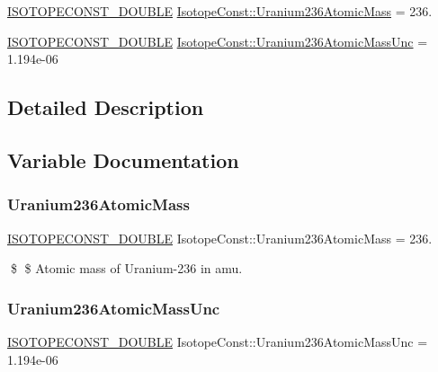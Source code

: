 \begin{DoxyCompactItemize}
\item 
\mbox{\hyperlink{group___isotope_const-_macros_ga8f45a7272ce02c0b4c65c44636ed719a}{I\+S\+O\+T\+O\+P\+E\+C\+O\+N\+S\+T\+\_\+\+D\+O\+U\+B\+LE}} \mbox{\hyperlink{group___isotope_const-_uranium-_u236_ga7f77188b8b85e605aec6bfb9cdb5fffe}{Isotope\+Const\+::\+Uranium236\+Atomic\+Mass}} = 236.
\item 
\mbox{\hyperlink{group___isotope_const-_macros_ga8f45a7272ce02c0b4c65c44636ed719a}{I\+S\+O\+T\+O\+P\+E\+C\+O\+N\+S\+T\+\_\+\+D\+O\+U\+B\+LE}} \mbox{\hyperlink{group___isotope_const-_uranium-_u236_gae130a39c824df6b756ce53dcf76a14da}{Isotope\+Const\+::\+Uranium236\+Atomic\+Mass\+Unc}} = 1.\+194e-\/06
\end{DoxyCompactItemize}


\subsection{Detailed Description}


\subsection{Variable Documentation}
\mbox{\label{group___isotope_const-_uranium-_u236_ga7f77188b8b85e605aec6bfb9cdb5fffe}} 
\subsubsection{\texorpdfstring{Uranium236\+Atomic\+Mass}{Uranium236AtomicMass}}
{\footnotesize\ttfamily \mbox{\hyperlink{group___isotope_const-_macros_ga8f45a7272ce02c0b4c65c44636ed719a}{I\+S\+O\+T\+O\+P\+E\+C\+O\+N\+S\+T\+\_\+\+D\+O\+U\+B\+LE}} Isotope\+Const\+::\+Uranium236\+Atomic\+Mass = 236.}

\$ \$ Atomic mass of Uranium-\/236 in amu. \mbox{\label{group___isotope_const-_uranium-_u236_gae130a39c824df6b756ce53dcf76a14da}} 
\subsubsection{\texorpdfstring{Uranium236\+Atomic\+Mass\+Unc}{Uranium236AtomicMassUnc}}
{\footnotesize\ttfamily \mbox{\hyperlink{group___isotope_const-_macros_ga8f45a7272ce02c0b4c65c44636ed719a}{I\+S\+O\+T\+O\+P\+E\+C\+O\+N\+S\+T\+\_\+\+D\+O\+U\+B\+LE}} Isotope\+Const\+::\+Uranium236\+Atomic\+Mass\+Unc = 1.\+194e-\/06}

